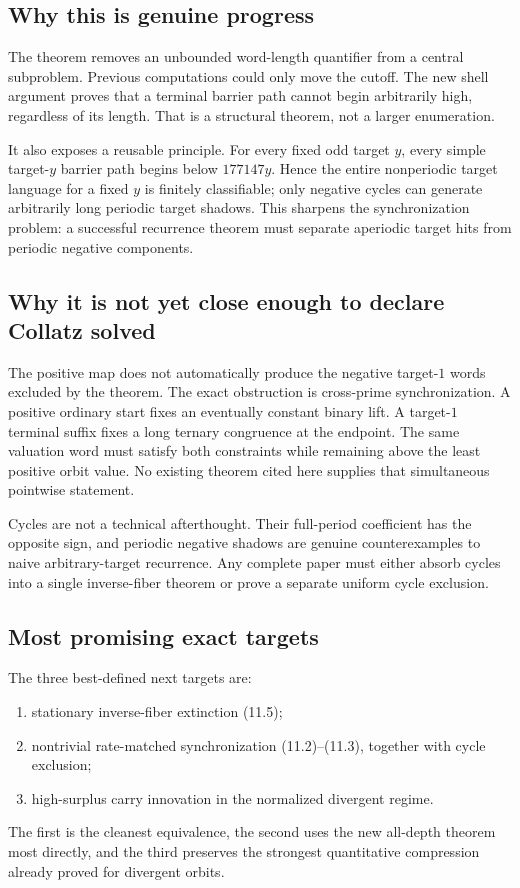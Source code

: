 \documentclass[11pt]{article}
\theoremstyle{definition}
\theoremstyle{remark}
\begin{document}
\subsection{Why this is genuine progress}

The theorem removes an unbounded word-length quantifier from a central
subproblem.  Previous computations could only move the cutoff.  The new
shell argument proves that a terminal barrier path cannot begin arbitrarily
high, regardless of its length.  That is a structural theorem, not a larger
enumeration.

It also exposes a reusable principle.  For every fixed odd target $y$, every
simple target-$y$ barrier path begins below $177147y$.  Hence the entire
nonperiodic target language for a fixed $y$ is finitely classifiable; only
negative cycles can generate arbitrarily long periodic target shadows.  This
sharpens the synchronization problem: a successful recurrence theorem must
separate aperiodic target hits from periodic negative components.

\subsection{Why it is not yet close enough to declare Collatz solved}

The positive map does not automatically produce the negative target-$1$
words excluded by the theorem.  The exact obstruction is cross-prime
synchronization.  A positive ordinary start fixes an eventually constant
binary lift.  A target-$1$ terminal suffix fixes a long ternary congruence at
the endpoint.  The same valuation word must satisfy both constraints while
remaining above the least positive orbit value.  No existing theorem cited
here supplies that simultaneous pointwise statement.

Cycles are not a technical afterthought.  Their full-period coefficient has
the opposite sign, and periodic negative shadows are genuine counterexamples
to naive arbitrary-target recurrence.  Any complete paper must either absorb
cycles into a single inverse-fiber theorem or prove a separate uniform cycle
exclusion.

\subsection{Most promising exact targets}

The three best-defined next targets are:
\begin{enumerate}[label=\textup{(\arabic*)}]
\item stationary inverse-fiber extinction \textup{(11.5)};
\item nontrivial rate-matched synchronization
\textup{(11.2)}--\textup{(11.3)}, together with cycle exclusion;
\item high-surplus carry innovation in the normalized divergent regime.
\end{enumerate}
The first is the cleanest equivalence, the second uses the new all-depth
theorem most directly, and the third preserves the strongest quantitative
compression already proved for divergent orbits.
\end{document}
